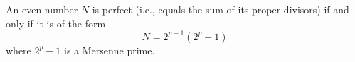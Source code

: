 An even number $N$ is perfect (i.e., equals the sum of its proper divisors) if and only if it is of the form
$$N = 2^{p-1}(2^p - 1)$$
where $2^p - 1$ is a Mersenne prime.
